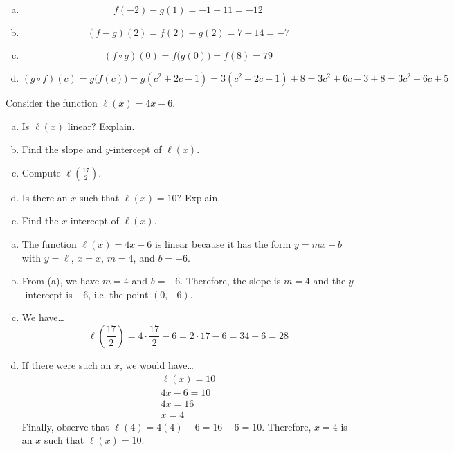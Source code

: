 \documentclass[12pt,letterpaper]{exam}
\begin{document}
\begin{questions}
\begin{enumerate}[(a)]
        \item 
        		\[
        		f(-2) - g(1)= -1 - 11= -12
        		\] \pspace
        
        \item 
        		\[
        		(f - g)(2)= f(2) - g(2)= 7 - 14= -7
        		\] \pspace
        
        \item 
        		\[
        		(f \circ g)(0)= f \big( g(0) \big)= f(8)= 79
        		\] \pspace
        
        \item 
        		\[
        		(g \circ f)(c)= g \big( f(c) \big)= g(c^2 + 2c - 1)= 3(c^2 + 2c - 1) + 8= 3c^2 + 6c - 3 + 8= 3c^2 + 6c + 5
        		\]
        \end{enumerate}



\newpage
\question[10] Consider the function $\ell(x)= 4x - 6$.
	\begin{enumerate}[(a)]
	\item Is $\ell(x)$ linear? Explain. 
	\item Find the slope and $y$-intercept of $\ell(x)$. 
	\item Compute $\ell(\frac{17}{2})$. 
	\item Is there an $x$ such that $\ell(x)= 10$? Explain. 
	\item Find the $x$-intercept of $\ell(x)$. 
	\end{enumerate} \pspace

\sol 
\begin{enumerate}[(a)]
\item The function $\ell(x)= 4x - 6$ is linear because it has the form $y= mx + b$ with $y= \ell$, $x= x$, $m= 4$, and $b= -6$. \pspace

\item From (a), we have $m= 4$ and $b= -6$. Therefore, the slope is $m= 4$ and the $y$-intercept is $-6$, i.e. the point $(0, -6)$. \pspace

\item We have\dots
	\[
	\ell \left( \dfrac{17}{2} \right)= 4 \cdot \dfrac{17}{2} - 6= 2 \cdot 17 - 6= 34 - 6= 28
	\] \pspace

\item If there were such an $x$, we would have\dots
	\[
	\begin{gathered}
	\ell(x)= 10 \\
	4x - 6= 10 \\
	4x= 16 \\
	x= 4
	\end{gathered}
	\]
Finally, observe that $\ell(4)= 4(4) - 6= 16 - 6= 10$. Therefore, $x= 4$ is an $x$ such that $\ell(x)= 10$. \pspace


\end{enumerate}
\end{questions}
\end{document}
